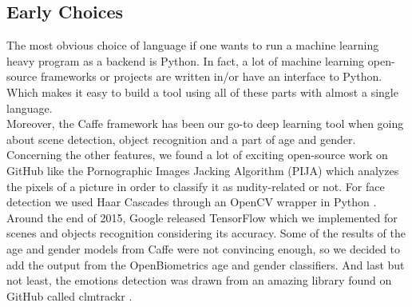 \documentclass{article}
\begin{document}
    \subsection{Early Choices}
        The most obvious choice of language if one wants to run a machine learning heavy program as a backend is Python. In fact, a lot of machine learning open-source frameworks or projects are written in/or have an interface to Python. Which makes it easy to build a tool using all of these parts with almost a single language.
        \\Moreover, the Caffe framework \cite{caffe} has been our go-to deep learning tool when going about scene detection, object recognition and a part of age and gender.
        Concerning the other features, we found a lot of exciting open-source work on GitHub like the Pornographic Images Jacking Algorithm (PIJA) \cite{pija} which analyzes the pixels of a picture in order to classify it as nudity-related or not. For face detection we used Haar Cascades through an OpenCV wrapper in Python \cite{haar}.
        \\Around the end of 2015, Google released TensorFlow \cite{tensor} which we implemented for scenes and objects recognition considering its accuracy.
        Some of the results of the age and gender models from Caffe were not convincing enough, so we decided to add the output from the OpenBiometrics \cite{openbr} age and gender classifiers.
        And last but not least, the emotions detection was drawn from an amazing library found on GitHub called clmtrackr \cite{clm}.
    \newpage
\end{document}

